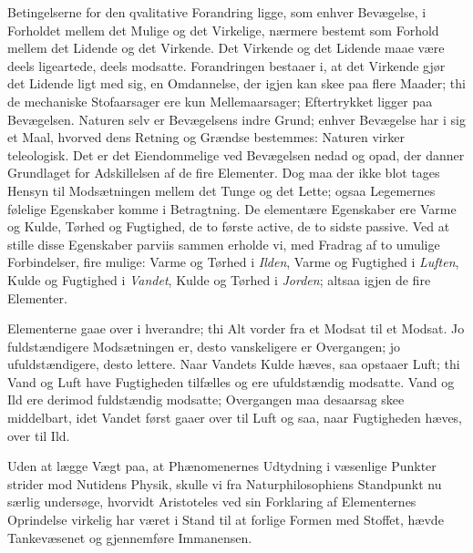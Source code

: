 \documentclass[12pt,a4paper]{book}
\begin{document}
Betingelserne for den qvalitative Forandring ligge, som enhver Bevægelse, i
Forholdet mellem det Mulige og det Virkelige, nærmere bestemt som Forhold
mellem det Lidende og det Virkende. Det Virkende og det Lidende maae være
deels ligeartede, deels modsatte. Forandringen bestaaer i, at det Virkende
gjør det Lidende ligt med sig, en Omdannelse, der igjen kan skee paa flere
Maader; thi de mechaniske Stofaarsager ere kun Mellemaarsager; Eftertrykket
ligger paa Bevægelsen. Naturen selv er Bevægelsens indre Grund; enhver
Bevægelse har i sig et Maal, hvorved dens Retning og Grændse bestemmes:
Naturen virker teleologisk. Det er det Eiendommelige ved Bevægelsen nedad og
opad, der danner Grundlaget for Adskillelsen af de fire Elementer. Dog maa der
ikke blot tages Hensyn til Modsætningen mellem det Tunge og det Lette; ogsaa
Legemernes følelige Egenskaber komme i Betragtning. De elementære Egenskaber
ere Varme og Kulde, Tørhed og Fugtighed, de to første
active, de to sidste passive. Ved at stille disse Egenskaber parviis sammen
erholde vi, med Fradrag af to umulige Forbindelser, fire mulige: Varme og
Tørhed i \emph{Ilden}, Varme og Fugtighed i \emph{Luften}, Kulde og Fugtighed
i \emph{Vandet}, Kulde og Tørhed i \emph{Jorden}; altsaa igjen de fire
Elementer.

Elementerne gaae over i hverandre; thi Alt vorder fra et Modsat til et
Modsat. Jo fuldstændigere Modsætningen er, desto vanskeligere er Overgangen;
jo ufuldstændigere, desto lettere. Naar Vandets Kulde hæves, saa opstaaer
Luft; thi Vand og Luft have Fugtigheden tilfælles og ere ufuldstændig
modsatte. Vand og Ild ere derimod fuldstændig modsatte; Overgangen maa
desaarsag skee middelbart, idet Vandet først gaaer over til Luft og saa, naar
Fugtigheden hæves, over til Ild.

Uden at lægge Vægt paa, at Phænomenernes Udtydning i væsenlige Punkter strider
mod Nutidens Physik, skulle vi fra Naturphilosophiens Standpunkt nu særlig
undersøge, hvorvidt Aristoteles ved sin Forklaring af Elementernes Oprindelse
virkelig har været i Stand til at forlige Formen med Stoffet, hævde
Tankevæsenet og gjennemføre Immanensen.
\end{document}

